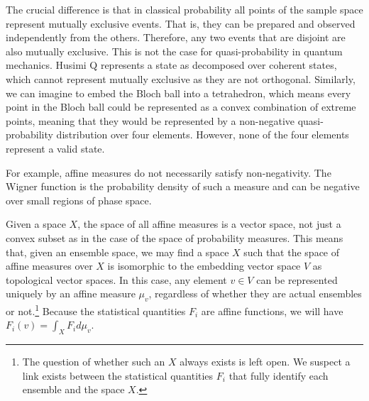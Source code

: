 \documentclass[10pt,twocolumn, nofootinbib]{revtex4-2}
\begin{document}
The crucial difference is that in classical probability all points of the sample space represent mutually exclusive events. That is, they can be prepared and observed independently from the others. Therefore, any two events that are disjoint are also mutually exclusive. This is not the case for quasi-probability in quantum mechanics. Husimi Q represents a state as decomposed over coherent states, which cannot represent mutually exclusive as they are not orthogonal. Similarly, we can imagine to embed the Bloch ball into a tetrahedron, which means every point in the Bloch ball could be represented as a convex combination of extreme points, meaning that they would be represented by a non-negative quasi-probability distribution over four elements. However, none of the four elements represent a valid state.


For example, affine measures do not necessarily satisfy non-negativity. The Wigner function is the probability density of such a measure and can be negative over small regions of phase space.

Given a space $X$, the space of all affine measures is a vector space, not just a convex subset as in the case of the space of probability measures. This means that, given an ensemble space, we may find a space $X$ such that the space of affine measures over $X$ is isomorphic to the embedding vector space $V$ as topological vector spaces. In this case, any element $v\in V$ can be represented uniquely by an affine measure $\mu_{v}$, regardless of whether they are actual ensembles or not.\footnote{The question of whether such an $X$ always exists is left open. We suspect a link exists between the statistical quantities $F_i$ that fully identify each ensemble and the space $X$.} Because the statistical quantities $F_i$ are affine functions, we will have $F_i(v) = \int_X F_i d\mu_{v}$.
\end{document}
